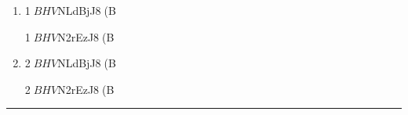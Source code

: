     \openKaiFile
    \begin{enumerate}[1.\ ]
	    \item 1$BHV$NLdBjJ8(B
    	    \begin{Kaitou}
        	    1$BHV$N2rEzJ8(B
	        \end{Kaitou}
    	\item 2$BHV$NLdBjJ8(B
    	    \begin{Kaitou}
        	    2$BHV$N2rEzJ8(B
	        \end{Kaitou}
    \end{enumerate}
    \closeKaiFile
    \vfill
    \hrule
    \begin{center}\textbf{$B!Z2rEz![(B}\end{center}
    \small%
